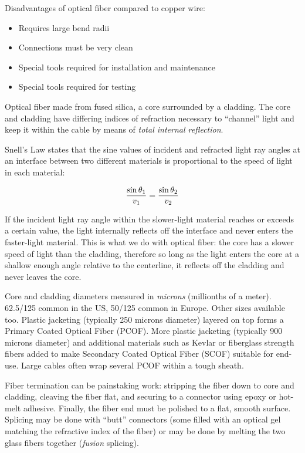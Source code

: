 \vskip 10pt

Disadvantages of optical fiber compared to copper wire:

\begin{itemize}
\item{} Requires large bend radii
\item{} Connections must be very clean
\item{} Special tools required for installation and maintenance
\item{} Special tools required for testing
\end{itemize}

\vskip 10pt

Optical fiber made from fused silica, a core surrounded by a cladding.  The core and cladding have differing indices of refraction necessary to ``channel'' light and keep it within the cable by means of {\it total internal reflection}.

\vskip 10pt

Snell's Law states that the sine values of incident and refracted light ray angles at an interface between two different materials is proportional to the speed of light in each material:

$${{\sin \theta_1} \over v_1} = {{\sin \theta_2} \over v_2}$$

If the incident light ray angle within the slower-light material reaches or exceeds a certain value, the light internally reflects off the interface and never enters the faster-light material.  This is what we do with optical fiber: the core has a slower speed of light than the cladding, therefore so long as the light enters the core at a shallow enough angle relative to the centerline, it reflects off the cladding and never leaves the core.

\vskip 10pt

Core and cladding diameters measured in {\it microns} (millionths of a meter).  62.5/125 common in the US, 50/125 common in Europe.  Other sizes available too.  Plastic jacketing (typically 250 microns diameter) layered on top forms a Primary Coated Optical Fiber (PCOF).  More plastic jacketing (typically 900 microns diameter) and additional materials such as Kevlar or fiberglass strength fibers added to make Secondary Coated Optical Fiber (SCOF) suitable for end-use.  Large cables often wrap several PCOF within a tough sheath.

\vskip 10pt

Fiber termination can be painstaking work: stripping the fiber down to core and cladding, cleaving the fiber flat, and securing to a connector using epoxy or hot-melt adhesive.  Finally, the fiber end must be polished to a flat, smooth surface.  Splicing may be done with ``butt'' connectors (some filled with an optical gel matching the refractive index of the fiber) or may be done by melting the two glass fibers together ({\it fusion} splicing).

